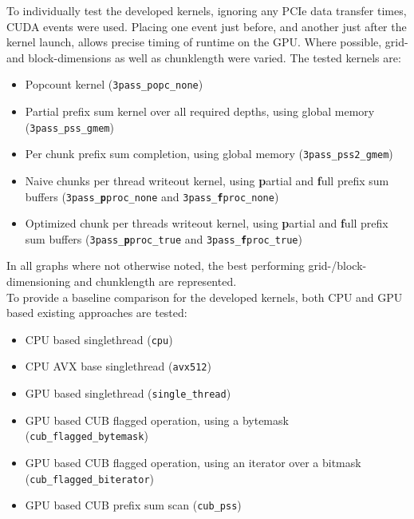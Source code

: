 \documentclass{tudscrreprt}
\begin{document}
			To individually test the developed kernels, ignoring any PCIe data transfer times, CUDA events were used. Placing one event just before, and another just after the kernel launch, allows precise timing of runtime on the GPU. Where possible, grid- and block-dimensions as well as chunklength were varied. The tested kernels are:\\
			\begin{itemize}
				\item Popcount kernel (\texttt{3pass\_popc\_none})
				\item Partial prefix sum kernel over all required depths, using global memory (\texttt{3pass\_pss\_gmem})
				\item Per chunk prefix sum completion, using global memory (\texttt{3pass\_pss2\_gmem})
				\item Naive chunks per thread writeout kernel, using \textbf{p}artial and \textbf{f}ull prefix sum buffers (\texttt{3pass\_\textbf{p}proc\_none} and \texttt{3pass\_\textbf{f}proc\_none})
				\item Optimized chunk per threads writeout kernel, using \textbf{p}artial and \textbf{f}ull prefix sum buffers (\texttt{3pass\_\textbf{p}proc\_true} and \texttt{3pass\_\textbf{f}proc\_true})
			\end{itemize}
			In all graphs where not otherwise noted, the best performing grid-/block-dimensioning and chunklength are represented. \\
			
			To provide a baseline comparison for the developed kernels, both CPU and GPU based existing approaches are tested:
			\begin{itemize}
				\item CPU based singlethread (\texttt{cpu})
				\item CPU AVX base singlethread (\texttt{avx512})
				\item GPU based singlethread (\texttt{single\_thread})
				\item GPU based CUB flagged operation, using a bytemask (\texttt{cub\_flagged\_bytemask})
				\item GPU based CUB flagged operation, using an iterator over a bitmask (\texttt{cub\_flagged\_biterator})
				\item GPU based CUB prefix sum scan (\texttt{cub\_pss})
			\end{itemize}
			
\end{document}
